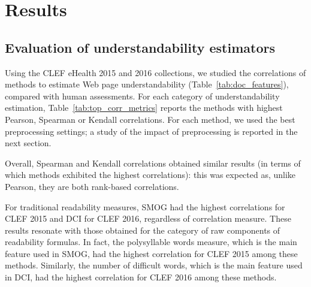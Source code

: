 
\section*{Results}
\subsection*{Evaluation of understandability estimators}
\label{sec:beyond_readability}




Using the CLEF eHealth 2015 and 2016 collections, we studied the correlations of methods to estimate Web page understandability (Table~\ref{tab:doc_features}), compared with human assessments. For each category of understandability estimation, Table~\ref{tab:top_corr_metrics} reports the methods with highest Pearson, Spearman or Kendall correlations. For each method, we used the best preprocessing settings; 
a study of the impact of preprocessing is reported in the next section.

Overall, Spearman and Kendall correlations obtained similar results (in terms of which methods exhibited the highest correlations): this was expected as, unlike Pearson, they are both rank-based correlations.

For traditional readability measures, SMOG had the highest correlations for CLEF 2015 and DCI for CLEF 2016, regardless of correlation measure. These results resonate with those obtained for the category of raw components of readability formulas. %
In fact, the polysyllable words measure, which is the main feature used in SMOG, had the highest correlation for CLEF 2015 among these methods. Similarly, the number of difficult words, which is the main feature used in DCI, had the highest correlation for CLEF 2016 among these methods.

